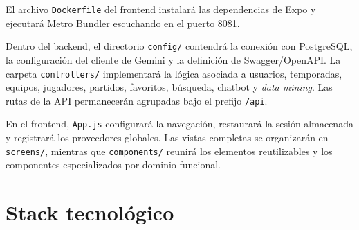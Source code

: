 El archivo \texttt{Dockerfile} del frontend instalar\'a las dependencias de Expo
y ejecutar\'a Metro Bundler escuchando en el puerto 8081.

Dentro del backend, el directorio \texttt{config/} contendr\'a la conexi\'on con
PostgreSQL, la configuraci\'on del cliente de Gemini y la definici\'on de
Swagger/OpenAPI. La carpeta \texttt{controllers/} implementar\'a la l\'ogica
asociada a usuarios, temporadas, equipos, jugadores, partidos, favoritos,
b\'usqueda, chatbot y \textit{data mining}. Las rutas de la API permanecer\'an agrupadas
bajo el prefijo \texttt{/api}.

En el frontend, \texttt{App.js} configurar\'a la navegaci\'on, restaurar\'a la
sesi\'on almacenada y registrar\'a los proveedores globales. Las vistas completas
se organizar\'an en \texttt{screens/}, mientras que \texttt{components/} reunir\'a
los elementos reutilizables y los componentes especializados por dominio
funcional.


\section{Stack tecnol\'ogico}

